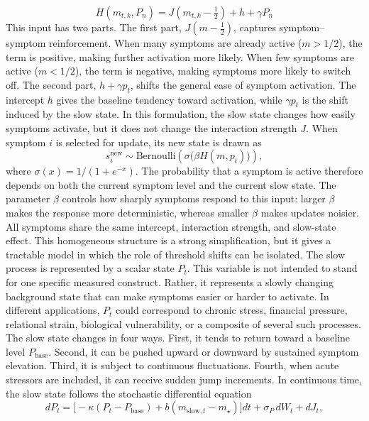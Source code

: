 \documentclass[man,12pt,floatsintext]{apa7}
\begin{document}
\begin{equation}
H(m_{t,k}, P_n) = J\left(m_{t,k} - \tfrac{1}{2}\right) + h + \gamma P_n
\label{eq:fast_input}
\end{equation}
This input has two parts. The first part, \(J(m-\tfrac12)\), captures symptom--symptom reinforcement. When many symptoms are already active (\(m>1/2\)), the term is positive, making further activation more likely. When few symptoms are active (\(m<1/2\)), the term is negative, making symptoms more likely to switch off. The second part, \(h+\gamma p_t\), shifts the general ease of symptom activation. The intercept \(h\) gives the baseline tendency toward activation, while \(\gamma p_t\) is the shift induced by the slow state. In this formulation, the slow state changes how easily symptoms activate, but it does not change the interaction strength \(J\).
When symptom \(i\) is selected for update, its new state is drawn as
\begin{equation}
s_i^{\mathrm{new}} \sim \mathrm{Bernoulli}\!\left(\sigma\!\big(\beta H(m,p_t)\big)\right),
\label{eq:fast_update}
\end{equation}
where \(\sigma(x)=1/(1+e^{-x})\). The probability that a symptom is active therefore depends on both the current symptom level and the current slow state. The parameter \(\beta\) controls how sharply symptoms respond to this input: larger \(\beta\) makes the response more deterministic, whereas smaller \(\beta\) makes updates noisier. All symptoms share the same intercept, interaction strength, and slow-state effect. This homogeneous structure is a strong simplification, but it gives a tractable model in which the role of threshold shifts can be isolated.
The slow process is represented by a scalar state \(P_t\). This variable is not intended to stand for one specific measured construct. Rather, it represents a slowly changing background state that can make symptoms easier or harder to activate. In different applications, \(P_t\) could correspond to chronic stress, financial pressure, relational strain, biological vulnerability, or a composite of several such processes.
The slow state changes in four ways. First, it tends to return toward a baseline level \(P_{\text{base}}\). Second, it can be pushed upward or downward by sustained symptom elevation. Third, it is subject to continuous fluctuations. Fourth, when acute stressors are included, it can receive sudden jump increments. In continuous time, the slow state follows the stochastic differential equation
\begin{equation}
dP_t = \Big[ -\kappa(P_t - P_{\text{base}}) + b(m_{\text{slow},t} - m_{\star}) \Big] dt + \sigma_P \, dW_t + dJ_t,
\label{eq:slow_sde}
\end{equation}
\end{document}
